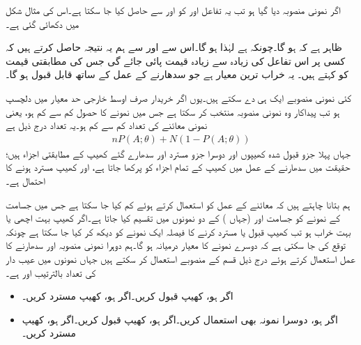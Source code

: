 اگر نمونی منصوبہ دیا گیا ہو تب یہ تفاعل اور  کو   اور  سے حاصل کیا جا سکتا ہے۔اس کی مثال شکل میں دکھائی گئی ہے۔

ظاہر ہے کہ  ہو گا۔چونکہ  ہے لہٰذا   ہو گا۔اس سے اور  سے ہم یہ نتیجہ حاصل کرتے ہیں کہ کسی  پر اس تفاعل کی زیادہ سے زیادہ قیمت پائی جائے گی جس کی مطابقتی قیمت  کو  کہتے ہیں۔ یہ خراب ترین معیار ہے جو سدھارنے کے عمل کے ساتھ قابل قبول ہو گا۔

کئی نمونی منصوبے ایک ہی  دے سکتے ہیں۔یوں اگر خریدار صرف اوسط خارجی حد معیار میں دلچسپ ہو تب پیداکار وہ نمونی منصوبہ منتخب کر سکتا ہے جس میں نمونے کا حصول کم سے کم ہو، یعنی   نمونی معائنے کی تعداد  کم سے کم ہو۔یہ تعداد درج ذیل ہے
\begin{align*}
nP(A;\theta)+N(1-P(A;\theta))
\end{align*}
جہاں پہلا جزو قبول شدہ کھیپوں اور دوسرا جزو مسترد اور سدھارے گئے کھیپ کے مطابقتی اجزاء ہیں؛ حقیقت میں سدھارنے کے عمل میں کھیپ کے تمام  اجزاء کو پرکھا جاتا ہے، اور کھیپ مسترد ہونے کا احتمال  ہے۔

ہم بتانا چاہتے ہیں کہ معائنے کے عمل کو  استعمال کرتے ہوئے کم کیا جا سکتا ہے جس میں جسامت  کے نمونے کو جسامت  اور  (جہاں )  کے دو نمونوں میں تقسیم کیا جاتا ہے۔اگر کھیپ بہت اچھی یا بہت خراب ہو تب کھیپ قبول یا مسترد کرنے کا فیصلہ ایک نمونے کو دیکھ کر کیا جا سکتا ہے چونکہ توقع کی جا سکتی ہے کہ دوسرے نمونے  کا معیار درمیانہ ہو گا۔ہم دوہرا نمونی منصوبہ اور سدھارنے کا عمل استعمال کرتے ہوئے  درج ذیل قسم کے منصوبے استعمال کر سکتے ہیں جہاں نمونوں میں عیب دار کی تعداد بالترتیب  اور  ہے۔
\begin{itemize}
\item
اگر  ہو، کھیپ قبول کریں۔اگر  ہو، کھیپ مسترد کریں۔
\item
اگر  ہو، دوسرا نمونہ بھی استعمال کریں۔اگر  ہو، کھیپ قبول کریں۔اگر  ہو، کھیپ مسترد کریں۔
\end{itemize}

